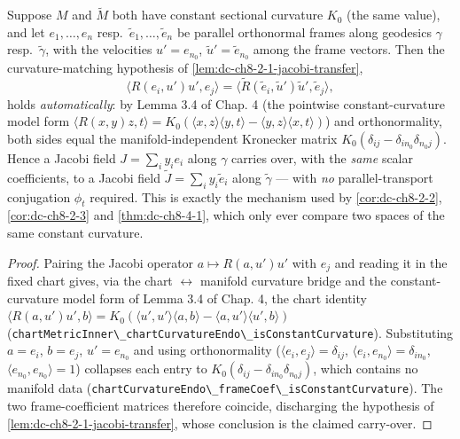 \begin{lemma}
  \label{lem:dc-ch8-2-1-jacobi-transfer-const}
  \leanok
  Suppose $M$ and $\tilde M$ both have constant sectional curvature $K_0$ (the same value),
  and let $e_1,\dots,e_n$ resp.\ $\tilde e_1,\dots,\tilde e_n$ be parallel orthonormal frames
  along geodesics $\gamma$ resp.\ $\tilde\gamma$, with the velocities $u'=e_{n_0}$,
  $\tilde u'=\tilde e_{n_0}$ among the frame vectors. Then the curvature-matching hypothesis
  of \cref{lem:dc-ch8-2-1-jacobi-transfer},
  $$
  \langle R(e_i,u')u',e_j\rangle=\langle\tilde R(\tilde e_i,\tilde u')\tilde u',\tilde e_j\rangle,
  $$
  holds \emph{automatically}: by Lemma 3.4 of Chap. 4 (the pointwise constant-curvature model
  form $\langle R(x,y)z,t\rangle=K_0(\langle x,z\rangle\langle y,t\rangle-\langle y,z\rangle\langle x,t\rangle)$)
  and orthonormality, both sides equal the manifold-independent Kronecker matrix
  $K_0(\delta_{ij}-\delta_{i n_0}\delta_{n_0 j})$. Hence a Jacobi field $J=\sum_i y_i e_i$ along
  $\gamma$ carries over, with the \emph{same} scalar coefficients, to a Jacobi field
  $\tilde J=\sum_i y_i\tilde e_i$ along $\tilde\gamma$ --- with \emph{no} parallel-transport
  conjugation $\phi_t$ required. This is exactly the mechanism used by \cref{cor:dc-ch8-2-2},
  \cref{cor:dc-ch8-2-3} and \cref{thm:dc-ch8-4-1}, which only ever compare two spaces of the
  same constant curvature.
\end{lemma}
\begin{proof}
  \leanok
  Pairing the Jacobi operator $a\mapsto R(a,u')u'$ with $e_j$ and reading it in the fixed chart
  gives, via the chart $\leftrightarrow$ manifold curvature bridge and the constant-curvature
  model form of Lemma 3.4 of Chap. 4, the chart identity
  $\langle R(a,u')u',b\rangle=K_0(\langle u',u'\rangle\langle a,b\rangle-\langle a,u'\rangle\langle u',b\rangle)$
  (\lstinline{chartMetricInner\_chartCurvatureEndo\_isConstantCurvature}). Substituting
  $a=e_i$, $b=e_j$, $u'=e_{n_0}$ and using orthonormality
  ($\langle e_i,e_j\rangle=\delta_{ij}$, $\langle e_i,e_{n_0}\rangle=\delta_{i n_0}$,
  $\langle e_{n_0},e_{n_0}\rangle=1$) collapses each entry to
  $K_0(\delta_{ij}-\delta_{i n_0}\delta_{n_0 j})$, which contains no manifold data
  (\lstinline{chartCurvatureEndo\_frameCoef\_isConstantCurvature}). The two frame-coefficient
  matrices therefore coincide, discharging the hypothesis of
  \cref{lem:dc-ch8-2-1-jacobi-transfer}, whose conclusion is the claimed carry-over.
\end{proof}

